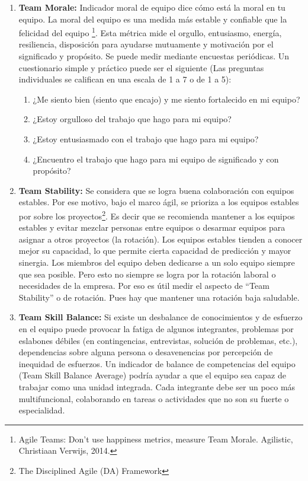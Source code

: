 \begin{enumerate}
\item {\textbf{Team Morale:}
Indicador moral de equipo dice cómo está la moral en tu equipo. La moral del equipo es una medida más estable y confiable que la felicidad del equipo \footnote{Agile Teams: Don't use happiness metrics, measure Team Morale. Agilistic, Christiaan Verwijs, 2014.}. Esta métrica mide el orgullo, entusiasmo, energía, resiliencia, disposición para ayudarse mutuamente y motivación por el significado y propósito. Se puede medir mediante encuestas periódicas. Un cuestionario simple y práctico puede ser el siguiente (Las preguntas individuales se califican en una escala de 1 a 7 o de 1 a 5):
  \begin{enumerate}
  \item {¿Me siento bien (siento que encajo) y me siento fortalecido en mi equipo?}
  \item {¿Estoy orgulloso del trabajo que hago para mi equipo?}
  \item {¿Estoy entusiasmado con el trabajo que hago para mi equipo?}
  \item {¿Encuentro el trabajo que hago para mi equipo de significado y con propósito?}
  \end{enumerate}
}

\item {\textbf{Team Stability:} Se considera que se logra buena colaboración con equipos estables. Por ese motivo, bajo el marco ágil, se prioriza a los equipos estables por sobre los proyectos\footnote{The Disciplined Agile (DA) Framework}. Es decir que se recomienda mantener a los equipos estables y evitar mezclar personas entre equipos o desarmar equipos para asignar a otros proyectos (la rotación). Los equipos estables tienden a conocer mejor su capacidad, lo que permite cierta capacidad de predicción y mayor sinergia. Los miembros del equipo deben dedicarse a un solo equipo siempre que sea posible. Pero esto no siempre se logra por la rotación laboral o necesidades de la empresa. Por eso es útil medir el aspecto de “Team Stability” o  de rotación. Pues hay que mantener una rotación baja saludable.
}

\item {\textbf{Team Skill Balance:} 
Si existe un desbalance de conocimientos y de esfuerzo en el equipo puede provocar la fatiga de algunos integrantes, problemas por eslabones débiles (en contingencias, entrevistas, solución de problemas, etc.), dependencias sobre alguna persona o desavenencias por percepción de inequidad de esfuerzos. Un indicador de balance de competencias del equipo (Team Skill Balance Average) podría ayudar a que el equipo sea capaz de trabajar como una unidad integrada. Cada integrante debe ser un poco más multifuncional, colaborando en tareas o actividades que no son su fuerte o especialidad. 
}

\end{enumerate}

